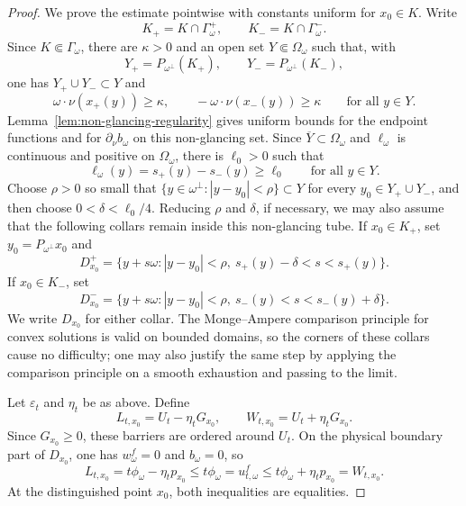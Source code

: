 \documentclass[11pt]{article}
\numberwithin{equation}{section}
\begin{document}
\begin{proof}
We prove the estimate pointwise with constants uniform for \(x_0\in K\).  Write
\[
    K_+=K\cap\Gamma_\omega^+,
    \qquad
    K_-=K\cap\Gamma_\omega^- .
\]
Since \(K\Subset\Gamma_\omega\), there are \(\kappa>0\) and an open set \(Y\Subset\Omega_\omega\) such that, with
\[
    Y_+=P_{\omega^\perp}(K_+),
    \qquad
    Y_-=P_{\omega^\perp}(K_-),
\]
one has \(Y_+\cup Y_-\subset Y\) and
\[
    \omega\cdot\nu(x_+(y))\ge\kappa,
    \qquad
    -\omega\cdot\nu(x_-(y))\ge\kappa
    \qquad \text{for all }y\in Y .
\]
Lemma~\ref{lem:non-glancing-regularity} gives uniform bounds for the endpoint functions and for \(\partial_\nu b_\omega\) on this non-glancing set.  Since \(\overline Y\subset\Omega_\omega\) and \(\ell_\omega\) is continuous and positive on \(\Omega_\omega\), there is \(\ell_0>0\) such that
\[
    \ell_\omega(y)=s_+(y)-s_-(y)\ge \ell_0
    \qquad \text{for all }y\in Y .
\]
Choose \(\rho>0\) so small that \(\{y\in\omega^\perp:|y-y_0|<\rho\}\subset Y\) for every \(y_0\in Y_+\cup Y_-\), and then choose \(0<\delta<\ell_0/4\).  Reducing \(\rho\) and \(\delta\), if necessary, we may also assume that the following collars remain inside this non-glancing tube.  If \(x_0\in K_+\), set \(y_0=P_{\omega^\perp}x_0\) and
\begin{equation}\label{eq:plus-boundary-collar}
    D_{x_0}^+
    =
    \{y+s\omega: |y-y_0|<\rho,\ s_+(y)-\delta<s<s_+(y)\}.
\end{equation}
If \(x_0\in K_-\), set
\begin{equation}\label{eq:minus-boundary-collar}
    D_{x_0}^-
    =
    \{y+s\omega: |y-y_0|<\rho,\ s_-(y)<s<s_-(y)+\delta\}.
\end{equation}
We write \(D_{x_0}\) for either collar.  The Monge--Ampere comparison principle for convex solutions is valid on bounded domains, so the corners of these collars cause no difficulty; one may also justify the same step by applying the comparison principle on a smooth exhaustion and passing to the limit.

Let \(\varepsilon_t\) and \(\eta_t\) be as above.  Define
\begin{equation}\label{eq:boundary-local-barriers}
    L_{t,x_0}=U_t-\eta_tG_{x_0},
    \qquad
    W_{t,x_0}=U_t+\eta_tG_{x_0}.
\end{equation}
Since \(G_{x_0}\ge0\), these barriers are ordered around \(U_t\).  On the physical boundary part of \(D_{x_0}\), one has \(w_\omega^f=0\) and \(b_\omega=0\), so
\[
    L_{t,x_0}=t\phi_\omega-\eta_t p_{x_0}
    \le
    t\phi_\omega
    =u_{t,\omega}^f
    \le
    t\phi_\omega+\eta_t p_{x_0}
    =W_{t,x_0}.
\]
At the distinguished point \(x_0\), both inequalities are equalities.


\end{proof}
\end{document}
